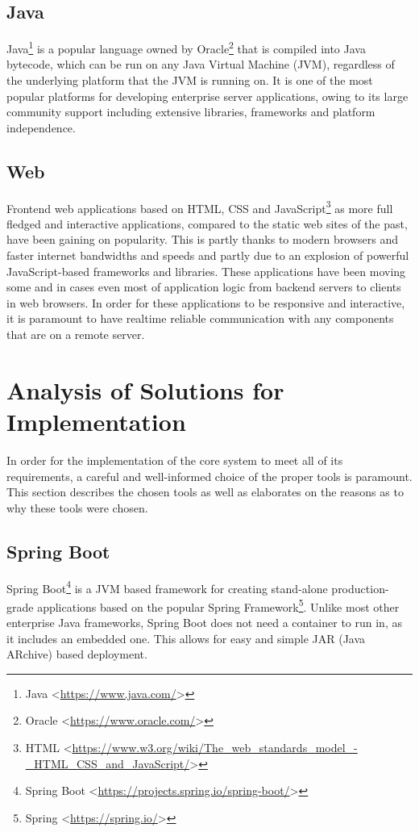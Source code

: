 \subsection{Java}
Java\footnote{Java <\url{https://www.java.com/}>} is a popular language owned by Oracle\footnote{Oracle <\url{https://www.oracle.com/}>} that is compiled into Java bytecode, which can be run on any Java Virtual Machine (JVM), regardless of the underlying platform that the JVM is running on. It is one of the most popular platforms for developing enterprise server applications, owing to its large community support including extensive libraries, frameworks and platform independence.

\subsection{Web}
Frontend web applications based on HTML, CSS and JavaScript\footnote{HTML <\url{https://www.w3.org/wiki/The_web_standards_model_-_HTML_CSS_and_JavaScript/}>} as more full fledged and interactive applications, compared to the static web sites of the past, have been gaining on popularity. This is partly thanks to modern browsers and faster internet bandwidths and speeds and partly due to an explosion of powerful JavaScript-based frameworks and libraries. These applications have been moving some and in cases even most of application logic from backend servers to clients in web browsers. In order for these applications to be responsive and interactive, it is paramount to have realtime reliable communication with any components that are on a remote server.

\section{Analysis of Solutions for Implementation}
In order for the implementation of the core system to meet all of its requirements, a careful and well-informed choice of the proper tools is paramount. This section describes the chosen tools as well as elaborates on the reasons as to why these tools were chosen.
\subsection{Spring Boot}
Spring Boot\footnote{Spring Boot <\url{https://projects.spring.io/spring-boot/}>} is a JVM based framework for creating stand-alone production-grade applications based on the popular Spring Framework\footnote{Spring <\url{https://spring.io/}>}. Unlike most other enterprise Java frameworks, Spring Boot does not need a container to run in, as it includes an embedded one. This allows for easy and simple JAR (Java ARchive) based deployment.

